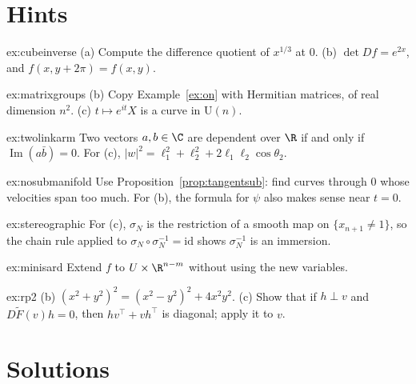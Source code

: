 \section{Hints}

\begin{hint}{ex:cubeinverse}
(a) Compute the difference quotient of $x^{1/3}$ at $0$. (b) $\det Df=e^{2x}$, and $f(x,y+2\pi)=f(x,y)$.
\end{hint}
\begin{hint}{ex:matrixgroups}
(b) Copy Example~\ref{ex:on} with Hermitian matrices, of real dimension $n^2$. (c) $t\mapsto e^{it}X$ is a curve in $\mathrm U(n)$.
\end{hint}
\begin{hint}{ex:twolinkarm}
Two vectors $a,b\in\C$ are dependent over $\R$ if and only if $\operatorname{Im}(a\bar b)=0$. For (c), $|w|^2=\ell_1^2+\ell_2^2+2\ell_1\ell_2\cos\theta_2$.
\end{hint}
\begin{hint}{ex:nosubmanifold}
Use Proposition~\ref{prop:tangentsub}: find curves through $0$ whose velocities span too much. For (b), the formula for $\psi$ also makes sense near $t=0$.
\end{hint}
\begin{hint}{ex:stereographic}
For (c), $\sigma_N$ is the restriction of a smooth map on $\{x_{n+1}\ne1\}$, so the chain rule applied to $\sigma_N\circ\sigma_N^{-1}=\mathrm{id}$ shows
$\sigma_N^{-1}$ is an immersion.
\end{hint}
\begin{hint}{ex:minisard}
Extend $f$ to $U\times\R^{n-m}$ without using the new variables.
\end{hint}
\begin{hint}{ex:rp2}
(b) $(x^2+y^2)^2=(x^2-y^2)^2+4x^2y^2$. (c) Show that if $h\perp v$ and $D\tilde F(v)h=0$, then $hv^\top+vh^\top$ is diagonal; apply it to $v$.
\end{hint}

\section{Solutions}

